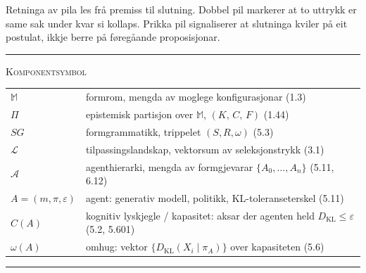 \documentclass[a4paper,11pt]{article}
\begin{document}

\vspace{0.4em}

Retninga av pila les frå premiss til slutning. Dobbel pil markerer at to uttrykk er same sak under kvar si kollaps. Prikka pil signaliserer at slutninga kviler på eit postulat, ikkje berre på føregåande proposisjonar.

\vspace{0.4em}

\hrule

\vspace{0.4em}

{\scshape\small Komponentsymbol}\\[0.4em]

\begin{tabular}{@{}lp{14cm}@{}}
$\mathbb{M}$ & formrom, mengda av moglege konfigurasjonar (1.3)\\
$\Pi$ & epistemisk partisjon over $\mathbb{M}$, $(K,\,C,\,F)$ (1.44)\\
$SG$ & formgrammatikk, trippelet $(S,R,\omega)$ (5.3)\\
$\mathcal{L}$ & tilpassingslandskap, vektorsum av seleksjonstrykk (3.1)\\
$\mathcal{A}$ & agenthierarki, mengda av formgjevarar $\{A_0,\dots,A_n\}$ (5.11, 6.12)\\
$A=(m,\pi,\varepsilon)$ & agent: generativ modell, politikk, KL-toleranseterskel (5.11)\\
$C(A)$ & kognitiv lyskjegle / kapasitet: aksar der agenten held $D_{\mathrm{KL}}\le\varepsilon$ (5.2, 5.601)\\
$\omega(A)$ & omhug: vektor $\{D_{\mathrm{KL}}(X_i\mid\pi_A)\}$ over kapasiteten (5.6)\\
\end{tabular}

\vspace{0.4em}

\hrule
\end{document}
